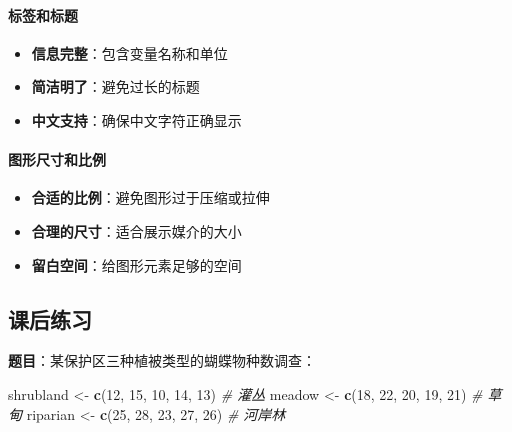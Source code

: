 \documentclass[
]{book}
\newenvironment{Shaded}{\begin{snugshade}}{\end{snugshade}}
\newcommand{\CommentTok}[1]{\textcolor[rgb]{0.56,0.35,0.01}{\textit{#1}}}
\newcommand{\DecValTok}[1]{\textcolor[rgb]{0.00,0.00,0.81}{#1}}
\newcommand{\FunctionTok}[1]{\textcolor[rgb]{0.13,0.29,0.53}{\textbf{#1}}}
\newcommand{\NormalTok}[1]{#1}
\newcommand{\OtherTok}[1]{\textcolor[rgb]{0.56,0.35,0.01}{#1}}
\providecommand{\tightlist}{%
  \setlength{\itemsep}{0pt}\setlength{\parskip}{0pt}}
\begin{document}
\hypertarget{ux6807ux7b7eux548cux6807ux9898}{%
\paragraph{标签和标题}\label{ux6807ux7b7eux548cux6807ux9898}}

\begin{itemize}
\tightlist
\item
  \textbf{信息完整}：包含变量名称和单位
\item
  \textbf{简洁明了}：避免过长的标题
\item
  \textbf{中文支持}：确保中文字符正确显示
\end{itemize}

\hypertarget{ux56feux5f62ux5c3aux5bf8ux548cux6bd4ux4f8b}{%
\paragraph{图形尺寸和比例}\label{ux56feux5f62ux5c3aux5bf8ux548cux6bd4ux4f8b}}

\begin{itemize}
\tightlist
\item
  \textbf{合适的比例}：避免图形过于压缩或拉伸
\item
  \textbf{合理的尺寸}：适合展示媒介的大小
\item
  \textbf{留白空间}：给图形元素足够的空间
\end{itemize}

\hypertarget{ux8bfeux540eux7ec3ux4e60-6}{%
\subsection{课后练习}\label{ux8bfeux540eux7ec3ux4e60-6}}

\textbf{题目}：某保护区三种植被类型的蝴蝶物种数调查：

\begin{Shaded}
\begin{Highlighting}[]
\NormalTok{shrubland }\OtherTok{\textless{}{-}} \FunctionTok{c}\NormalTok{(}\DecValTok{12}\NormalTok{, }\DecValTok{15}\NormalTok{, }\DecValTok{10}\NormalTok{, }\DecValTok{14}\NormalTok{, }\DecValTok{13}\NormalTok{)    }\CommentTok{\# 灌丛}
\NormalTok{meadow }\OtherTok{\textless{}{-}} \FunctionTok{c}\NormalTok{(}\DecValTok{18}\NormalTok{, }\DecValTok{22}\NormalTok{, }\DecValTok{20}\NormalTok{, }\DecValTok{19}\NormalTok{, }\DecValTok{21}\NormalTok{)       }\CommentTok{\# 草甸}
\NormalTok{riparian }\OtherTok{\textless{}{-}} \FunctionTok{c}\NormalTok{(}\DecValTok{25}\NormalTok{, }\DecValTok{28}\NormalTok{, }\DecValTok{23}\NormalTok{, }\DecValTok{27}\NormalTok{, }\DecValTok{26}\NormalTok{)     }\CommentTok{\# 河岸林}
\end{Highlighting}
\end{Shaded}
\end{document}
